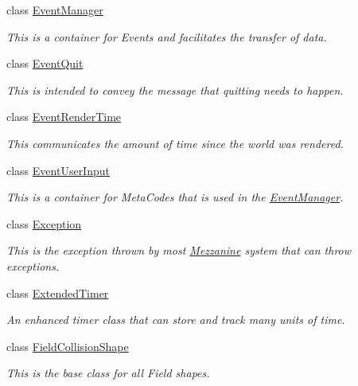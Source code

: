 \begin{DoxyCompactItemize}
class \hyperlink{classMezzanine_1_1EventManager}{EventManager}
\begin{DoxyCompactList}\small\item\em This is a container for Events and facilitates the transfer of data. \item\end{DoxyCompactList}\item 
class \hyperlink{classMezzanine_1_1EventQuit}{EventQuit}
\begin{DoxyCompactList}\small\item\em This is intended to convey the message that quitting needs to happen. \item\end{DoxyCompactList}\item 
class \hyperlink{classMezzanine_1_1EventRenderTime}{EventRenderTime}
\begin{DoxyCompactList}\small\item\em This communicates the amount of time since the world was rendered. \item\end{DoxyCompactList}\item 
class \hyperlink{classMezzanine_1_1EventUserInput}{EventUserInput}
\begin{DoxyCompactList}\small\item\em This is a container for MetaCodes that is used in the \hyperlink{classMezzanine_1_1EventManager}{EventManager}. \item\end{DoxyCompactList}\item 
class \hyperlink{classMezzanine_1_1Exception}{Exception}
\begin{DoxyCompactList}\small\item\em This is the exception thrown by most \hyperlink{namespaceMezzanine}{Mezzanine} system that can throw exceptions. \item\end{DoxyCompactList}\item 
class \hyperlink{classMezzanine_1_1ExtendedTimer}{ExtendedTimer}
\begin{DoxyCompactList}\small\item\em An enhanced timer class that can store and track many units of time. \item\end{DoxyCompactList}\item 
class \hyperlink{classMezzanine_1_1FieldCollisionShape}{FieldCollisionShape}
\begin{DoxyCompactList}\small\item\em This is the base class for all Field shapes. \item\end{DoxyCompactList}\item 

\end{DoxyCompactItemize}
